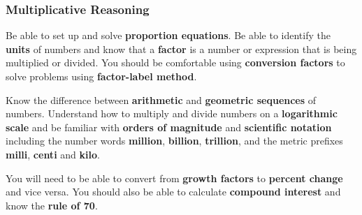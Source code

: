 \documentclass[11pt]{exam}
\begin{document}
\subsubsection*{Multiplicative Reasoning}

Be able to set up and solve \textbf{proportion equations}.  Be able to identify the \textbf{units} of numbers and know that a \textbf{factor} is a number or expression that is being multiplied or divided.  You should be comfortable using \textbf{conversion factors} to solve problems using \textbf{factor-label method}.  

Know the difference between \textbf{arithmetic} and \textbf{geometric sequences} of numbers.  Understand how to multiply and divide numbers on a \textbf{logarithmic scale} and be familiar with \textbf{orders of magnitude} and \textbf{scientific notation} including the number words \textbf{million}, \textbf{billion}, \textbf{trillion}, and the metric prefixes \textbf{milli}, \textbf{centi} and \textbf{kilo}.  

You will need to be able to convert from \textbf{growth factors} to \textbf{percent change} and vice versa. You should also be able to calculate \textbf{compound interest} and know the \textbf{rule of 70}.   
\end{document}
